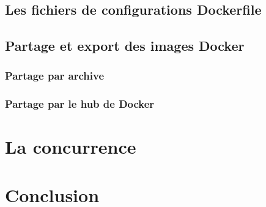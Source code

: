\documentclass{beamer}
\begin{document}
    \subsection{Les fichiers de configurations Dockerfile}
    \begin{frame}
       \begin{itemize}
       \end{itemize}
    \end{frame}

    \subsection{Partage et export des images Docker}
    \begin{frame}
       \begin{itemize}
       \end{itemize}
    \end{frame}

    \subsubsection{Partage par archive}
    \begin{frame}
    \end{frame}

    \subsubsection{Partage par le hub de Docker}
    \begin{frame}
    \end{frame}


    \section{La concurrence}
    \begin{frame}
    \end{frame}


    \section{Conclusion}
    \begin{frame}
    \end{frame}
\end{document}
